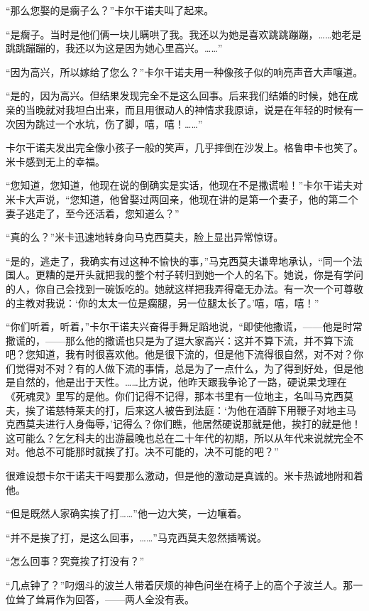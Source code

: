 \par “那么您娶的是瘸子么？”卡尔干诺夫叫了起来。
\par “是瘸子。当时是他们俩一块儿瞒哄了我。我还以为她是喜欢跳跳蹦蹦，……她老是跳跳蹦蹦的，我还以为这是因为她心里高兴。……”
\par “因为高兴，所以嫁给了您么？”卡尔干诺夫用一种像孩子似的响亮声音大声嚷道。
\par “是的，因为高兴。但结果发现完全不是这么回事。后来我们结婚的时候，她在成亲的当晚就对我坦白出来，而且用很动人的神情求我原谅，说是在年轻的时候有一次因为跳过一个水坑，伤了脚，嘻，嘻！……”
\par 卡尔干诺夫发出完全像小孩子一般的笑声，几乎摔倒在沙发上。格鲁申卡也笑了。米卡感到无上的幸福。
\par “您知道，您知道，他现在说的倒确实是实话，他现在不是撒谎啦！”卡尔干诺夫对米卡大声说，“您知道，他曾娶过两回亲，他现在讲的是第一个妻子，他的第二个妻子逃走了，至今还活着，您知道么？”
\par “真的么？”米卡迅速地转身向马克西莫夫，脸上显出异常惊讶。
\par “是的，逃走了，我确实有过这种不愉快的事，”马克西莫夫谦卑地承认，“同一个法国人。更糟的是开头就把我的整个村子转归到她一个人的名下。她说，你是有学问的人，你自己会找到一碗饭吃的。她就这样把我弄得毫无办法。有一次一个可尊敬的主教对我说：‘你的太太一位是瘸腿，另一位腿太长了。’嘻，嘻，嘻！”
\par “你们听着，听着，”卡尔干诺夫兴奋得手舞足蹈地说，“即使他撒谎，——他是时常撒谎的，——那么他的撒谎也只是为了逗大家高兴：这并不算下流，并不算下流吧？您知道，我有时很喜欢他。他是很下流的，但是他下流得很自然，对不对？你们觉得对不对？有的人做下流的事情，总是为了一点什么，为了得到好处，但是他是自然的，他是出于天性。……比方说，他昨天跟我争论了一路，硬说果戈理在《死魂灵》里写的是他。你们记得不记得，那本书里有一位地主，名叫马克西莫夫，挨了诺慈特莱夫的打，后来这人被告到法庭：‘为他在酒醉下用鞭子对地主马克西莫夫进行人身侮辱，’记得么？你们瞧，他居然硬说那就是他，挨打的就是他！这可能么？乞乞科夫的出游最晚也总在二十年代的初期，所以从年代来说就完全不对。他总不可能那时就挨了打。决不可能的，决不可能的吧？”
\par 很难设想卡尔干诺夫干吗要那么激动，但是他的激动是真诚的。米卡热诚地附和着他。
\par “但是既然人家确实挨了打……”他一边大笑，一边嚷着。
\par “并不是挨了打，是这么回事，……”马克西莫夫忽然插嘴说。
\par “怎么回事？究竟挨了打没有？”
\par “几点钟了？”叼烟斗的波兰人带着厌烦的神色问坐在椅子上的高个子波兰人。那一位耸了耸肩作为回答，——两人全没有表。
